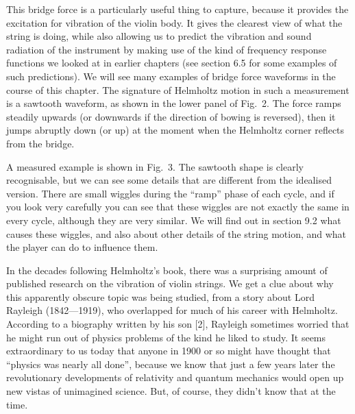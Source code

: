  This bridge force is a particularly useful thing to capture, because it 
  provides the excitation for vibration of the violin body. It gives the 
  clearest view of what the string is doing, while also allowing us to predict 
  the vibration and sound radiation of the instrument by making use of the kind 
  of frequency response functions we looked at in earlier chapters (see section 
  6.5 for some examples of such predictions). We will see many examples of 
  bridge force waveforms in the course of this chapter. The signature of 
  Helmholtz motion in such a measurement is a sawtooth waveform, as shown in 
  the lower panel of Fig.\ 2. The force ramps steadily upwards (or downwards if 
  the direction of bowing is reversed), then it jumps abruptly down (or up) at 
  the moment when the Helmholtz corner reflects from the bridge. 

  A measured example is shown in Fig.\ 3. The sawtooth shape is clearly 
  recognisable, but we can see some details that are different from the 
  idealised version. There are small wiggles during the ``ramp'' phase of each 
  cycle, and if you look very carefully you can see that these wiggles are not 
  exactly the same in every cycle, although they are very similar. We will find 
  out in section 9.2 what causes these wiggles, and also about other details of 
  the string motion, and what the player can do to influence them. 

  In the decades following Helmholtz’s book, there was a surprising amount of 
  published research on the vibration of violin strings. We get a clue about 
  why this apparently obscure topic was being studied, from a story about Lord 
  Rayleigh (1842—1919), who overlapped for much of his career with Helmholtz. 
  According to a biography written by his son [2], Rayleigh sometimes worried 
  that he might run out of physics problems of the kind he liked to study. It 
  seems extraordinary to us today that anyone in 1900 or so might have thought 
  that “physics was nearly all done”, because we know that just a few years 
  later the revolutionary developments of relativity and quantum mechanics 
  would open up new vistas of unimagined science. But, of course, they didn’t 
  know that at the time. 

